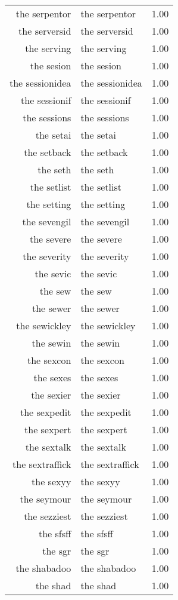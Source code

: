 \begin{table}[ht]
\begin{tabular}{rlr}
  the serpentor & the serpentor & 1.00 \\ 
  the serversid & the serversid & 1.00 \\ 
  the serving & the serving & 1.00 \\ 
  the sesion & the sesion & 1.00 \\ 
  the sessionidea & the sessionidea & 1.00 \\ 
  the sessionif & the sessionif & 1.00 \\ 
  the sessions & the sessions & 1.00 \\ 
  the setai & the setai & 1.00 \\ 
  the setback & the setback & 1.00 \\ 
  the seth & the seth & 1.00 \\ 
  the setlist & the setlist & 1.00 \\ 
  the setting & the setting & 1.00 \\ 
  the sevengil & the sevengil & 1.00 \\ 
  the severe & the severe & 1.00 \\ 
  the severity & the severity & 1.00 \\ 
  the sevic & the sevic & 1.00 \\ 
  the sew & the sew & 1.00 \\ 
  the sewer & the sewer & 1.00 \\ 
  the sewickley & the sewickley & 1.00 \\ 
  the sewin & the sewin & 1.00 \\ 
  the sexcon & the sexcon & 1.00 \\ 
  the sexes & the sexes & 1.00 \\ 
  the sexier & the sexier & 1.00 \\ 
  the sexpedit & the sexpedit & 1.00 \\ 
  the sexpert & the sexpert & 1.00 \\ 
  the sextalk & the sextalk & 1.00 \\ 
  the sextraffick & the sextraffick & 1.00 \\ 
  the sexyy & the sexyy & 1.00 \\ 
  the seymour & the seymour & 1.00 \\ 
  the sezziest & the sezziest & 1.00 \\ 
  the sfsff & the sfsff & 1.00 \\ 
  the sgr & the sgr & 1.00 \\ 
  the shabadoo & the shabadoo & 1.00 \\ 
  the shad & the shad & 1.00 \\ 

\end{tabular}
\end{table}
